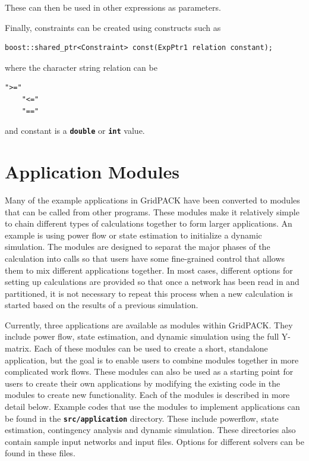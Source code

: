 \documentclass[12pt]{report} %
\begin{document}
These can then be used in other expressions as parameters.

Finally, constraints can be created using constructs such as

{
\color{red}
\begin{Verbatim}[fontseries=b]
boost::shared_ptr<Constraint> const(ExpPtr1 relation constant);
\end{Verbatim}
}

where the character string relation can be

{
\color{red}
\begin{Verbatim}[fontseries=b]
    ">="
    "<="
    "=="
\end{Verbatim}
}

and constant is a \texttt{\textbf{double}} or \texttt{\textbf{int}} value.

\chapter{Application Modules}

Many of the example applications in GridPACK have been converted to modules that can be called from other programs. These modules make it relatively simple to chain different types of calculations together to form larger applications. An example is using power flow or state estimation to initialize a dynamic simulation. The modules are designed to separat the major phases of the calculation into calls so that users have some fine-grained control that allows them to mix different applications together. In most cases, different options for setting up calculations are provided so that once a network has been read in and partitioned, it is not necessary to repeat this process when a new calculation is started based on the results of a previous simulation.

Currently, three applications are available as modules within GridPACK. They include power flow, state estimation, and dynamic simulation using the full Y-matrix. Each of these modules can be used to create a short, standalone application, but the goal is to enable users to combine modules together in more complicated work flows. These modules can also be used as a starting point for users to create their own applications by modifying the existing code in the modules to create new functionality. Each of the modules is described in more detail below. Example codes that use the modules to implement applications can be found in the \texttt{\textbf{src/application}} directory. These include powerflow, state estimation, contingency analysis and dynamic simulation. These directories also contain sample input networks and input files. Options for different solvers can be found in these files.
\end{document}
